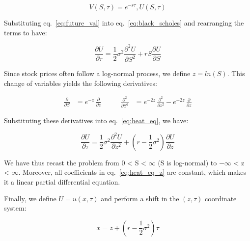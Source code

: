     \begin{equation}
        V(S,\tau) = e^{-r \tau},U(S,\tau)
        \label{eq:future_val}
    \end{equation}

    Substituting eq.~\ref{eq:future_val} into eq.~\ref{eq:black_scholes} and rearranging the terms to have:

    \begin{equation}
        \frac{\partial U}{\partial \tau}
        = \frac{1}{2} \sigma^2 \frac{\partial^2 U}{\partial S^2}
        + rS \frac{\partial U}{\partial S}
        \label{eq:heat_eq}
    \end{equation}

    Since stock prices often follow a log-normal process, we define $z = ln(S)$.
    This change of variables yields the following derivatives:

    \begin{equation*}
        \begin{aligned}
            \frac{\partial}{\partial S} &= e^{-z}\,\frac{\partial}{\partial z}
        \end{aligned}
        \qquad
        \begin{aligned}
            \frac{\partial^2}{\partial S^2} &= e^{-2z}\,\frac{\partial^2}{\partial z^2}
            - e^{-2z}\,\frac{\partial}{\partial z}
        \end{aligned}
    \end{equation*}

    Substituting these derivatives into eq.~\ref{eq:heat_eq}, we have:

    \begin{equation}
        \frac{\partial U}{\partial \tau} =
        \frac{1}{2} \sigma^2 \frac{\partial^2 U}{\partial z^2}
        + \left( r - \frac{1}{2} \sigma^2 \right) \frac{\partial U}{\partial z}
        \label{eq:heat_eq_z}
    \end{equation}

    We have thus recast the problem from 0 < S < $\infty$ (S is log-normal) to $-\infty$ < z < $\infty$. Moreover,
    all coefficients in eq.~\ref{eq:heat_eq_z} are constant, which makes it a linear partial differential equation.

    Finally, we define $U = u(x, \tau)$ and perform a shift in the $(z,\tau)$ coordinate system:

    \begin{equation}
        x = z + \left( r - \frac{1}{2} \sigma^2 \right) \tau
        \label{eq:shift}
    \end{equation}

